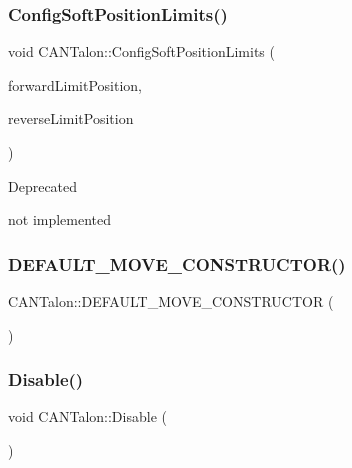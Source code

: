 \subsubsection{\texorpdfstring{Config\+Soft\+Position\+Limits()}{ConfigSoftPositionLimits()}}
{\footnotesize\ttfamily void C\+A\+N\+Talon\+::\+Config\+Soft\+Position\+Limits (\begin{DoxyParamCaption}\item[{double}]{forward\+Limit\+Position,  }\item[{double}]{reverse\+Limit\+Position }\end{DoxyParamCaption})\hspace{0.3cm}{\ttfamily [override]}}

\begin{DoxyRefDesc}{Deprecated}
\item[\hyperlink{deprecated__deprecated000002}{Deprecated}]not implemented \end{DoxyRefDesc}
\mbox{\label{class_c_a_n_talon_a31581c5215ebe60fe89dbce78468627a}} 
\subsubsection{\texorpdfstring{D\+E\+F\+A\+U\+L\+T\+\_\+\+M\+O\+V\+E\+\_\+\+C\+O\+N\+S\+T\+R\+U\+C\+T\+O\+R()}{DEFAULT\_MOVE\_CONSTRUCTOR()}}
{\footnotesize\ttfamily C\+A\+N\+Talon\+::\+D\+E\+F\+A\+U\+L\+T\+\_\+\+M\+O\+V\+E\+\_\+\+C\+O\+N\+S\+T\+R\+U\+C\+T\+OR (\begin{DoxyParamCaption}\item[{\hyperlink{class_c_a_n_talon}{C\+A\+N\+Talon}}]{ }\end{DoxyParamCaption})}

\mbox{\label{class_c_a_n_talon_a8bd799926d0efa4e4cf99d0f64e94371}} 
\subsubsection{\texorpdfstring{Disable()}{Disable()}}
{\footnotesize\ttfamily void C\+A\+N\+Talon\+::\+Disable (\begin{DoxyParamCaption}{ }\end{DoxyParamCaption})\hspace{0.3cm}{\ttfamily [override]}}

